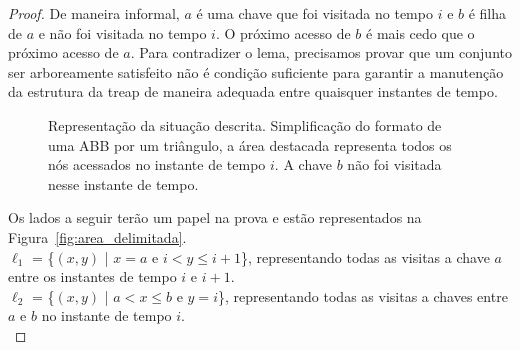 \begin{proof}
De maneira informal, $a$ é uma chave que foi visitada no tempo $i$ e $b$ é filha de $a$ e não foi visitada no tempo $i$. O próximo acesso de $b$ é mais cedo que o próximo acesso de $a$. Para contradizer o lema, precisamos provar que um conjunto ser arboreamente satisfeito não é condição suficiente para garantir a manutenção da estrutura da treap de maneira adequada entre quaisquer instantes de tempo.

\begin{figure}
    \caption{Representação da situação descrita. Simplificação do formato de uma ABB por um triângulo, a área destacada representa todos os nós acessados no instante de tempo $i$. A chave $b$ não foi visitada nesse instante de tempo.}
\label{fig:representacao_grafica}
\end{figure}

Os lados a seguir terão um papel na prova e estão representados na Figura~\ref{fig:area_delimitada}. \\
$\ell_1$ = \{$(x,y)$ | $x = a$ e $i < y \leq i+1$\}, representando todas as visitas a chave $a$ entre os instantes de tempo $i$ e $i+1$. \\
$\ell_2$ = \{$(x,y)$ | $a < x \leq b$ e $y = i$\}, representando todas as visitas a chaves entre $a$ e $b$ no instante de tempo $i$. \\



\end{proof}
